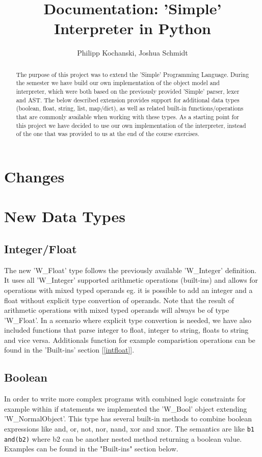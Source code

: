 \documentclass{article}
\begin{document}
\title{Documentation: 'Simple' Interpreter in Python}
\author{Philipp Kochanski, Joshua Schmidt}

\maketitle

\begin{abstract}
The purpose of this project was to extend the 'Simple' Programming Language.
During the semester we have build our own implementation of the object model and interpreter, which were both based
on the previously provided 'Simple' parser, lexer and AST. The below described extension provides support for additional data types (boolean, float, string, list, map/dict), as well as related built-in functions/operations that are commonly available when working with these types. As a starting point for this project we have decided to use our own implementation of the interpreter, instead of the one that was provided to us at the end of the course exercises. 
\end{abstract}

\section{Changes}

\section{New Data Types}
\subsection{Integer/Float}
The new 'W\_Float' type follows the previously available 'W\_Integer' definition. It uses all 'W\_Integer' supported arithmetic operations (built-ins) and allows for operations with mixed typed operands eg. it is possible to add an integer and a float without explicit type convertion of operands. Note that the result of arithmetic operations with mixed typed operands will always be of type 'W\_Float'. In a scenario where explicit type convertion is needed, we have also included functions that parse integer to float, integer to string, floats to string and vice versa. Additionals function for example comparistion operations can be found in the 'Built-ins' section [\ref{intfloat}].

\subsection{Boolean}
In order to write more complex programs with combined logic constraints for example within if statements we implemented the 'W\_Bool' object extending 'W\_NormalObject'.
This type has several built-in methods to combine boolean expressions like and, or, not, nor, nand, xor and xnor.
The semantics are like \texttt{b1 and(b2)} where b2 can be another nested method returning a boolean value. Examples can be found in the "Built-ins" section below.
\end{document}
